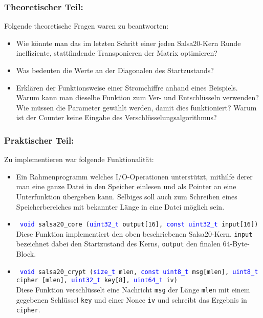 \documentclass[course=erap]{aspdoc}
\begin{document}
\subsubsection{Theoretischer Teil:}
Folgende theoretische Fragen waren zu beantworten:
\begin{itemize}
    \item Wie könnte man das im letzten Schritt einer jeden Salsa20-Kern Runde ineffiziente, stattfindende Transponieren der Matrix optimieren?
    \item Was bedeuten die Werte an der Diagonalen des Startzustands?
    \item Erklären der Funktionsweise einer Stromchiffre anhand eines Beispiels. Warum kann man dieselbe Funktion zum Ver- und Entschlüsseln verwenden? Wie müssen die Parameter gewählt werden, damit dies funktioniert? Warum ist der Counter keine Eingabe des Verschlüsselungsalgorithmus?
\end{itemize}

\subsubsection{Praktischer Teil:}
Zu implementieren  war folgende Funktionalität:
\begin{itemize}
    \item Ein Rahmenprogramm welches I/O-Operationen unterstützt, mithilfe derer man eine ganze Datei in den Speicher einlesen und als Pointer an eine Unterfunktion übergeben kann. Selbiges soll auch zum Schreiben eines Speicherbereiches mit bekannter Länge in eine Datei möglich sein.
    \item \texttt{ \textcolor{blue}{void} salsa20\_core (\textcolor{blue} {uint32\_t} output[16], \textcolor{blue}{const uint32\_t} input[16])} \\
    Diese Funktion implementiert den oben beschriebenen Salsa20-Kern. \texttt{input} bezeichnet dabei den Startzustand des Kerns, \texttt{output} den finalen 64-Byte-Block. \\
    \item \texttt{ \textcolor{blue} {void} salsa20\_crypt (\textcolor{blue}{size\_t} mlen, \textcolor{blue} {const uint8\_t} msg[mlen], \textcolor{blue}{uint8\_t} \break cipher [mlen], \textcolor{blue}{uint32\_t} key[8], \textcolor{blue} {uint64\_t} iv) }\\
    Diese Funktion verschlüsselt eine Nachricht \texttt{msg} der Länge \texttt{mlen} mit einem gegebenen Schlüssel \texttt{key} und einer Nonce \texttt{iv} und schreibt das Ergebnis in \texttt{cipher}.
\end{itemize}
\end{document}
